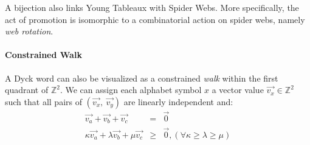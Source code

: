 \documentclass[nonatbib,numbers,10pt]{llncs}
\begin{document}
A bijection also links Young Tableaux with Spider Webs. More specifically, the act of promotion is isomorphic to a combinatorial action on spider webs, namely \textit{web rotation}\cite{petersen}.

\paragraph{\textbf{Constrained Walk}}
A Dyck word can also be visualized as a constrained \textit{walk} within the first quadrant of $\mathbb{Z}^2$. We can assign each alphabet symbol $x$ a vector value $\vec{v_x} \in \mathbb{Z}^2$ such that all pairs of $(\vec{v_x},\ \vec{v_y})$ are linearly independent and:
\begin{eqnarray}
\vec{v_a} + \vec{v_b} + \vec{v_c} &=& \vec{0} \\
\kappa\vec{v_a} + \lambda\vec{v_b} + \mu\vec{v_c} &\geq & \vec{0},  (\forall \kappa \geq \lambda \geq \mu)
\end{eqnarray}
\end{document}
